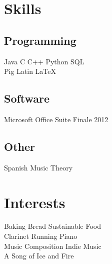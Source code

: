 \documentclass[letterpaper]{deedy-resume} %
\begin{document}
\begin{minipage}[t]{0.33\textwidth}

\section{Skills}

\subsection{Programming}
Java \textbullet{} C \textbullet{} C++ \textbullet{} Python \textbullet{} SQL \\
Pig Latin \textbullet{} \LaTeX\ \\
\subsection{Software}
Microsoft Office Suite \textbullet{} Finale 2012
\subsection{Other}
Spanish \textbullet{} Music Theory




\sectionspace %

\section{Interests}
Baking Bread \textbullet{} Sustainable Food \\
Clarinet \textbullet{} Running{} \textbullet{} Piano \\ 
Music Composition \textbullet{} Indie Music \\ 
A Song of Ice and Fire


\end{minipage} %
\end{document}
